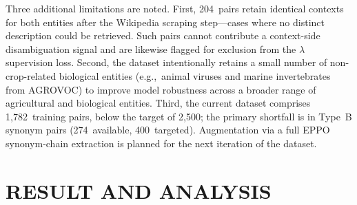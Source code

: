 Three additional limitations are noted.
First, 204~pairs retain identical contexts for both entities after
the Wikipedia scraping step---cases where no distinct description
could be retrieved. Such pairs cannot contribute a context-side
disambiguation signal and are likewise flagged for exclusion from
the $\lambda$ supervision loss.
Second, the dataset intentionally retains a small number of
non-crop-related biological entities (e.g.,\ animal viruses and marine
invertebrates from AGROVOC) to improve model robustness across a
broader range of agricultural and biological entities.
Third, the current dataset comprises 1{,}782~training pairs, below
the target of 2{,}500; the primary shortfall is in Type~B synonym
pairs (274~available, 400~targeted). Augmentation via a full EPPO
synonym-chain extraction is planned for the next iteration of the
dataset.

\section{RESULT AND ANALYSIS}
\label{sec:result}
